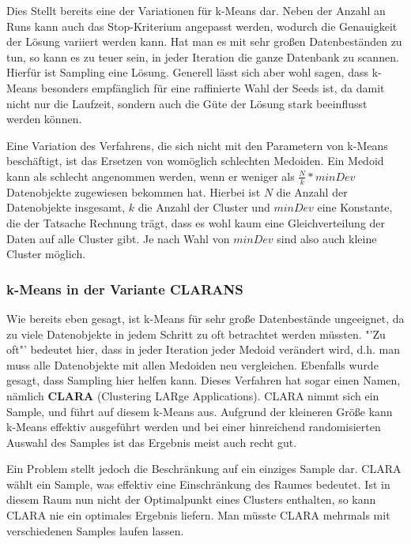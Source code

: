 Dies Stellt bereits eine der Variationen für k-Means dar. Neben der 
Anzahl an Runs kann auch das Stop-Kriterium angepasst werden,
wodurch die Genauigkeit der Lösung variiert werden kann. Hat man
es mit sehr großen Datenbeständen zu tun, so kann es zu teuer sein,
in jeder Iteration die ganze Datenbank zu scannen. Hierfür ist Sampling
eine Lösung. Generell lässt sich aber wohl sagen, dass k-Means 
besonders empfänglich für eine raffinierte Wahl der Seeds ist, da
damit nicht nur die Laufzeit, sondern auch die Güte der Lösung
stark beeinflusst werden können.

Eine Variation des Verfahrens, die sich nicht mit den Parametern
von k-Means beschäftigt, ist das Ersetzen von womöglich schlechten
Medoiden. Ein Medoid kann als schlecht angenommen werden, wenn er
weniger als \(\frac{N}{k}* minDev\) Datenobjekte zugewiesen
bekommen hat. Hierbei ist \(N\) die Anzahl der Datenobjekte
insgesamt, \(k\) die Anzahl der Cluster und \(minDev\) eine 
Konstante, die der Tatsache Rechnung trägt, dass es wohl kaum eine
Gleichverteilung der Daten auf alle Cluster gibt. Je nach Wahl von
\(minDev\) sind also auch kleine Cluster möglich.

\subsubsection{k-Means in der Variante CLARANS}
Wie bereits eben gesagt, ist k-Means für sehr große Datenbestände
ungeeignet, da zu viele Datenobjekte in jedem Schritt 
zu oft betrachtet werden
müssten. "'Zu oft"' bedeutet hier, dass in jeder Iteration jeder Medoid
verändert wird, d.h. man muss alle Datenobjekte mit allen Medoiden
neu vergleichen. Ebenfalls wurde gesagt, dass Sampling hier helfen kann.
Dieses Verfahren hat sogar einen Namen, nämlich \textbf{CLARA}
(Clustering LARge Applications). CLARA nimmt sich ein Sample,
und führt auf diesem k-Means aus. Aufgrund der kleineren Größe
kann k-Means effektiv ausgeführt werden und bei einer hinreichend 
randomisierten Auswahl des Samples ist das Ergebnis meist auch
recht gut.

Ein Problem stellt jedoch die Beschränkung auf ein einziges Sample
dar. CLARA wählt ein Sample, was effektiv eine Einschränkung des
Raumes bedeutet. Ist in diesem Raum nun nicht der Optimalpunkt
eines Clusters enthalten, so kann CLARA nie ein optimales Ergebnis 
liefern. Man müsste CLARA mehrmals mit verschiedenen Samples
laufen lassen.


